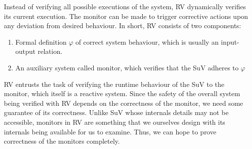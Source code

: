 %
%
%
Instead of verifying all possible executions of the system, \gls{RV}
dynamically verifies its current execution.
The monitor can be made to trigger corrective actions upon any
deviation from desired behaviour.
In short, \gls{RV} consists of two components:
\begin{enumerate}
\item Formal definition $φ$ of correct system behaviour, which is usually
  an input-output relation.
\item An auxiliary system called monitor, which verifies that the
  \gls{SuV} adheres to $φ$ 
\end{enumerate}

\gls{RV} entrusts the task of verifying the runtime behaviour of the
\gls{SuV} to the monitor, which itself is a reactive system.
Since the safety of the overall system being verified with \gls{RV}
depends on the correctness of the monitor, we need some guarantee of
its correctness.
Unlike \gls{SuV} whose internals details may not be accessible,
monitors in \gls{RV} are something that we ourselves design with its
internals being available for us to examine.
Thus, we can hope to prove correctness of the monitors completely.

